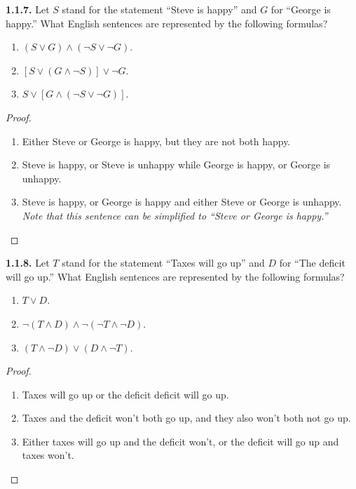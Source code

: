 \documentclass[12pt]{amsart}
\newenvironment{statement}[1]{\smallskip\noindent\color[rgb]{.6627, .3529, .6314} {\bf #1.}}{}
\theoremstyle{definition}
\theoremstyle{remark}
\begin{document}
\begin{statement}{1.1.7}
Let $S$ stand for the statement ``Steve is happy'' and $G$ for ``George is happy.''
What English sentences are represented by the following formulas?
\begin{enumerate}
	\item $(S \vee G) \wedge (\neg S \vee \neg G)$.
	\item $[S \vee (G \wedge \neg S)] \vee \neg G$.
	\item $S \vee [G \wedge (\neg S \vee \neg G)]$.
\end{enumerate}
\end{statement}

\begin{proof}
\hfill
\begin{enumerate}
	\item Either Steve or George is happy, but they are not both happy.
	\item Steve is happy, or Steve is unhappy while George is happy, or George is unhappy.
	\item Steve is happy, or George is happy and either Steve or George is unhappy.
	\emph{Note that this sentence can be simplified to ``Steve or George is happy.''}
\end{enumerate}
\end{proof}


\begin{statement}{1.1.8}
Let $T$ stand for the statement ``Taxes will go up'' and $D$ for ``The deficit will go up.''
What English sentences are represented by the following formulas?
\begin{enumerate}
	\item $T \vee D$.
	\item $\neg (T \wedge D) \wedge \neg (\neg T \wedge \neg D)$.
	\item $(T \wedge \neg D) \vee (D \wedge \neg T)$.
\end{enumerate}
\end{statement}

\begin{proof}
\hfill
\begin{enumerate}
	\item Taxes will go up or the deficit deficit will go up.
	\item Taxes and the deficit won't both go up, and they also won't both not go up.
	\item Either taxes will go up and the deficit won't, or the deficit will go up and taxes won't.
\end{enumerate}
\end{proof}
\end{document}

